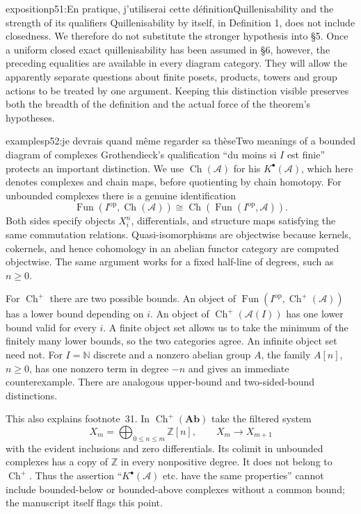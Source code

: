 \begin{dcomment}{exposition}{p51:En pratique, j'utiliserai cette définition}{Quillenisability and the strength of its qualifiers}
Quillenisability by itself, in Definition 1, does not include closedness. We therefore do not substitute the stronger hypothesis into \S5. Once a uniform closed exact quillenisability has been assumed in \S6, however, the preceding equalities are available in every diagram category. They will allow the apparently separate questions about finite posets, products, towers and group actions to be treated by one argument. Keeping this distinction visible preserves both the breadth of the definition and the actual force of the theorem's hypotheses.
\end{dcomment}

\begin{dcomment}{examples}{p52:je devrais quand même regarder sa thèse}{Two meanings of a bounded diagram of complexes}
Grothendieck's qualification ``du moins si $I$ est finie'' protects an important distinction. We use $\operatorname{Ch}(\mathcal A)$ for his $K^\bullet(\mathcal A)$, which here denotes complexes and chain maps, before quotienting by chain homotopy. For unbounded complexes there is a genuine identification
\[
 \operatorname{Fun}(I^{\mathrm{op}},\operatorname{Ch}(\mathcal A))
 \cong\operatorname{Ch}(\operatorname{Fun}(I^{\mathrm{op}},\mathcal A)).
\]
Both sides specify objects $X_i^n$, differentials, and structure maps satisfying the same commutation relations. Quasi-isomorphisms are objectwise because kernels, cokernels, and hence cohomology in an abelian functor category are computed objectwise. The same argument works for a fixed half-line of degrees, such as $n\geq0$.

For $\operatorname{Ch}^+$ there are two possible bounds. An object of $\operatorname{Fun}(I^{\mathrm{op}},\operatorname{Ch}^+(\mathcal A))$ has a lower bound depending on $i$. An object of $\operatorname{Ch}^+(\mathcal A(I))$ has one lower bound valid for every $i$. A finite object set allows us to take the minimum of the finitely many lower bounds, so the two categories agree. An infinite object set need not. For $I=\mathbb N$ discrete and a nonzero abelian group $A$, the family $A[n]$, $n\geq0$, has one nonzero term in degree $-n$ and gives an immediate counterexample. There are analogous upper-bound and two-sided-bound distinctions.

This also explains footnote~31. In $\operatorname{Ch}^+(\mathbf{Ab})$ take the filtered system
\[
 X_m=\bigoplus_{0\leq n\leq m}\mathbb Z[n],\qquad
 X_m\longrightarrow X_{m+1}
\]
with the evident inclusions and zero differentials. Its colimit in unbounded complexes has a copy of $\mathbb Z$ in every nonpositive degree. It does not belong to $\operatorname{Ch}^+$. Thus the assertion ``$K^\bullet(\mathcal A)$ etc. have the same properties'' cannot include bounded-below or bounded-above complexes without a common bound; the manuscript itself flags this point.


\end{dcomment}
